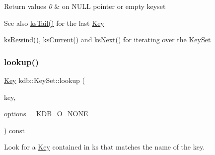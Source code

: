 \begin{DoxyRetVals}{Return values}
{\em 0} & on N\+U\+LL pointer or empty keyset \\
\hline
\end{DoxyRetVals}
\begin{DoxySeeAlso}{See also}
\hyperlink{group__keyset_gadca442c4ab43cf532b15091d7711559e}{ks\+Tail()} for the last \hyperlink{group__key}{Key} 

\hyperlink{group__keyset_gabe793ff51f1728e3429c84a8a9086b70}{ks\+Rewind()}, \hyperlink{group__keyset_ga4287b9416912c5f2ab9c195cb74fb094}{ks\+Current()} and \hyperlink{group__keyset_ga317321c9065b5a4b3e33fe1c399bcec9}{ks\+Next()} for iterating over the \hyperlink{group__keyset}{Key\+Set} 
\end{DoxySeeAlso}
\mbox{\label{classkdb_1_1KeySet_a2b8537e388edfbb6941d771106c0ae3a}} 
\subsubsection{\texorpdfstring{lookup()}{lookup()}\hspace{0.1cm}{\footnotesize\ttfamily [1/2]}}
{\footnotesize\ttfamily \hyperlink{classkdb_1_1Key}{Key} kdb\+::\+Key\+Set\+::lookup (\begin{DoxyParamCaption}\item[{const \hyperlink{classkdb_1_1Key}{Key} \&}]{key,  }\item[{const \hyperlink{group__keyset_gada05f4bbf46fde81d0d57df86e73d914}{elektra\+Lookup\+Flags}}]{options = {\ttfamily \hyperlink{group__keyset_ggada05f4bbf46fde81d0d57df86e73d914a00738455e0ae843c8720809d8287f370}{K\+D\+B\+\_\+\+O\+\_\+\+N\+O\+NE}} }\end{DoxyParamCaption}) const\hspace{0.3cm}{\ttfamily [inline]}}



Look for a \hyperlink{classkdb_1_1Key}{Key} contained in {\ttfamily ks} that matches the name of the {\ttfamily key}. 

